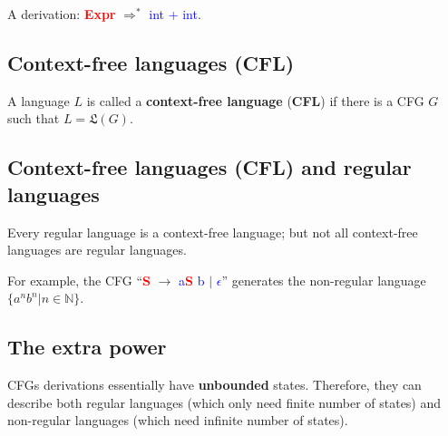\documentclass[12pt, letterpaper, oneside]{book}
\begin{document}
A derivation: \textcolor{red}{\textbf{Expr}} $\Rightarrow^*$ \textcolor{blue}{int + int}.

\subsection{Context-free languages (CFL)}

A language $L$ is called a \textbf{context-free language} (\textbf{CFL}) if there is a CFG $G$ such that $L =
  \mathfrak{L}(G)$.

\subsection{Context-free languages (CFL) and regular languages}

Every regular language is a context-free language; but not all context-free languages are regular languages.


For example, the CFG ``\textcolor{red}{\textbf{S}} $\rightarrow$ \textcolor{blue}{a}\textcolor{red}{\textbf{S}}
\textcolor{blue}{b} $|$ \textcolor{blue}{$\epsilon$}'' generates the non-regular language $\{ a^nb^n | n \in \mathbb{N}
  \}$.

\subsection{The extra power}

CFGs derivations essentially have \textbf{unbounded} states. Therefore, they can describe both regular languages (which
only need finite number of states) and non-regular languages (which need infinite number of states).
\end{document}
